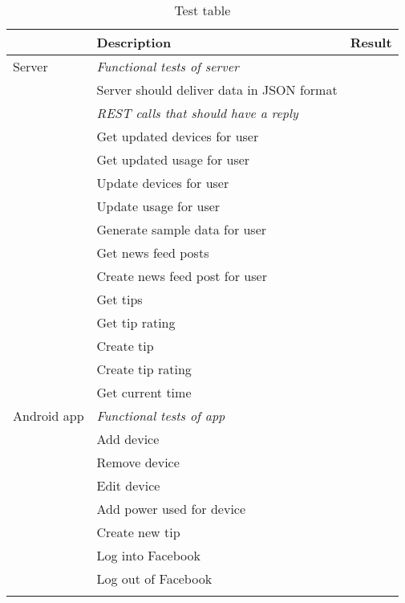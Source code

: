 \begin{table}[H]
\begin{tabular}{|l|l|l|}
\hline
\rowcolor{darkgray} & \textbf{Description} & \textbf{Result}\\\hline \arrayrulecolor{lightgray}
\rowcolor{lightgray} Server& \textit{Functional tests of server}&\\
\cline{1-2}\cline{2-3}
\rowcolor{lightgray}&Server should deliver data in JSON format&\\
\cline{1-2}\cline{2-3}
\rowcolor{lightgray}&\textit{REST calls that should have a reply}&\\
\cline{1-2}\cline{2-3}
\rowcolor{lightgray}&Get updated devices for user&\\
\cline{1-2}\cline{2-3}
\rowcolor{lightgray}&Get updated usage for user&\\
\cline{1-2}\cline{2-3}
\rowcolor{lightgray}&Update devices for user&\\
\cline{1-2}\cline{2-3}
\rowcolor{lightgray}&Update usage for user&\\
\cline{1-2}\cline{2-3}
\rowcolor{lightgray}&Generate sample data for user&\\
\cline{1-2}\cline{2-3}
\rowcolor{lightgray}&Get news feed posts&\\
\cline{1-2}\cline{2-3}
\rowcolor{lightgray}&Create news feed post for user&\\
\cline{1-2}\cline{2-3}
\rowcolor{lightgray}&Get tips&\\
\cline{1-2}\cline{2-3}
\rowcolor{lightgray}&Get tip rating&\\
\cline{1-2}\cline{2-3}
\rowcolor{lightgray}&Create tip&\\
\cline{1-2}\cline{2-3}
\rowcolor{lightgray}&Create tip rating&\\
\cline{1-2}\cline{2-3}
\rowcolor{lightgray}&Get current time&\\

\hline
\arrayrulecolor{darkgray}
\rowcolor{darkgray}Android app & \textit{Functional tests of app} &  \\ \cline{1-2}\cline{2-3}
\rowcolor{darkgray}&Add device&\\ \cline{1-2}\cline{2-3}
\rowcolor{darkgray}&Remove device&\\ \cline{1-2}\cline{2-3}
\rowcolor{darkgray}&Edit device&\\ \cline{1-2}\cline{2-3}
\rowcolor{darkgray}&Add power used for device&\\ \cline{1-2}\cline{2-3}
\rowcolor{darkgray}&Create new tip&\\ \cline{1-2}\cline{2-3}
\rowcolor{darkgray}&Log into Facebook&\\ \cline{1-2}\cline{2-3}
\rowcolor{darkgray}&Log out of Facebook&\\\arrayrulecolor{black}
\hline
\end{tabular}
\caption{Test table}
\label{tab:testTable}
\end{table}

